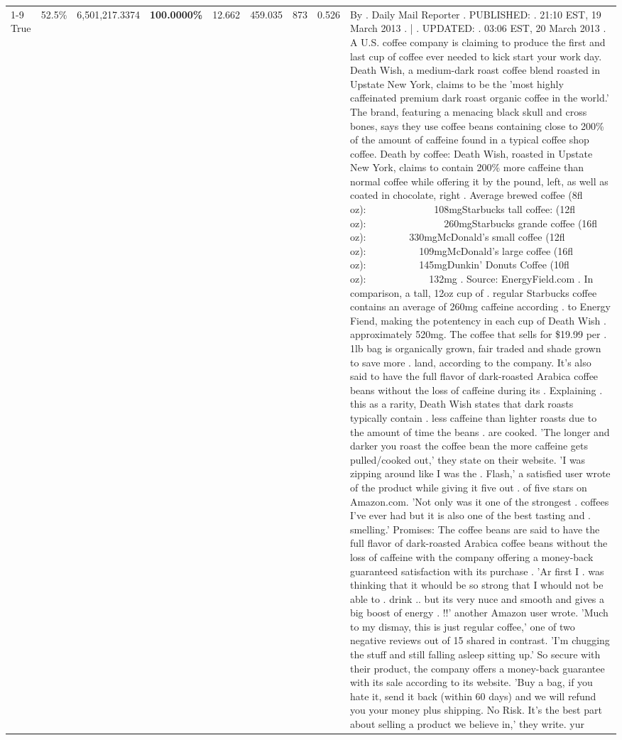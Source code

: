 \begin{table}[H]
{\begin{tabular}{lllrlllll}
\cline{1-9}
True & 52.5\% & 6,501,217.3374 & \bfseries \color{red} 100.0000\% & 12.662 & 459.035 & 873 & 0.526 & By . Daily Mail Reporter . PUBLISHED: . 21:10 EST, 19 March 2013 . | . UPDATED: . 03:06 EST, 20 March 2013 . A U.S. coffee company is claiming to produce the first and last cup of coffee ever needed to kick start your work day. Death Wish, a medium-dark roast coffee blend roasted in Upstate New York, claims to be the 'most highly caffeinated premium dark roast organic coffee in the world.' The brand, featuring a menacing black skull and cross bones, says they use coffee beans containing close to 200\% of the amount of caffeine found in a typical coffee shop coffee. Death by coffee: Death Wish, roasted in Upstate New York, claims to contain 200\% more caffeine than normal coffee while offering it by the pound, left, as well as coated in chocolate, right . Average brewed coffee (8fl oz):              108mgStarbucks tall coffee: (12fl oz):                260mgStarbucks grande coffee (16fl oz):         330mgMcDonald's small coffee (12fl oz):           109mgMcDonald's large coffee (16fl oz):           145mgDunkin' Donuts Coffee (10fl oz):             132mg . Source: EnergyField.com . In comparison, a tall, 12oz cup of . regular Starbucks coffee contains an average of 260mg caffeine according . to Energy Fiend, making the potentency in each cup of Death Wish . approximately 520mg. The coffee that sells for \$19.99 per . 1lb bag is organically grown, fair traded and shade grown to save more . land, according to the company. It's also said to have the full flavor of dark-roasted Arabica coffee beans without the loss of caffeine during its . Explaining . this as a rarity, Death Wish states that dark roasts typically contain . less caffeine than lighter roasts due to the amount of time the beans . are cooked. 'The longer and darker you roast the coffee bean the more caffeine gets pulled/cooked out,' they state on their website. 'I was zipping around like I was the . Flash,' a satisfied user wrote of the product while giving it five out . of five stars on Amazon.com. 'Not only was it one of the strongest . coffees I've ever had but it is also one of the best tasting and . smelling.’ Promises: The coffee beans are said to have the full flavor of dark-roasted Arabica coffee beans without the loss of caffeine with the company offering a money-back guaranteed satisfaction with its purchase . 'Ar first I . was thinking that it whould be so strong that I whould not be able to . drink .. but its very nuce and smooth and gives a big boost of energy . !!' another Amazon user wrote. 'Much to my dismay, this is just regular coffee,' one of two negative reviews out of 15 shared in contrast. 'I'm chugging the stuff and still falling asleep sitting up.' So secure with their product, the company offers a money-back guarantee with its sale according to its website. 'Buy a bag, if you hate it, send it back (within 60 days) and we will refund you your money plus shipping. No Risk. It’s the best part about selling a product we believe in,' they write. yur \\

\end{tabular}}
\end{table}
